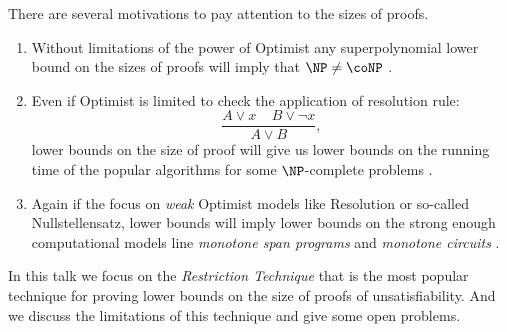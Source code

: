 There are several motivations to pay attention to the sizes of proofs.
\begin{enumerate}
    \item Without limitations of the power of Optimist any superpolynomial lower bound on the sizes of proofs
        will imply that $\NP \neq \coNP$ \cite{CookRec79}. 
    \item Even if Optimist is limited to check the application of resolution rule:
        $$
            \frac{A \lor x ~~~~~ B \lor \neg x}{A \lor B},
        $$
        lower bounds on the size of proof will give us lower bounds on the running time of the
        popular algorithms for some $\NP$-complete problems \cite{DP60, AHI05}.
    \item Again if the focus on \textit{weak} Optimist models like Resolution or so-called
        Nullstellensatz, lower bounds will imply lower bounds on the strong enough computational models
        line \textit{monotone span programs} and \textit{monotone circuits} \cite{PR18, GGKS18}.
\end{enumerate}

In this talk we focus on the \textit{Restriction Technique} that is the most popular technique for
proving lower bounds on the size of proofs of unsatisfiability. And we discuss the limitations of this
technique and give some open problems.


